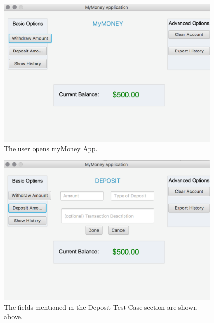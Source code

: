 \documentclass[12pt]{article}
\begin{document}
\begin{figure}[H]
  \includegraphics[width=\linewidth]{open_app.png}
  \caption{The user opens myMoney App.}
\end{figure}

\begin{figure}[H]
  \includegraphics[width=\linewidth]{deposit_click.png}
  \caption{The fields mentioned in the Deposit Test Case section are shown above.}
\end{figure}
\end{document}
